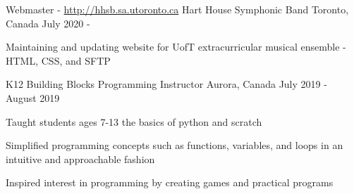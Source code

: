 

\begin{cventries}

  \cventry
  {Webmaster - \url{http://hhsb.sa.utoronto.ca}} %
  {Hart House Symphonic Band} %
  {Toronto, Canada} %
  {July 2020 - } %
  {
    \begin{cvitems} %
      \item {Maintaining and updating website for UofT extracurricular musical ensemble - HTML, CSS, and SFTP}
    \end{cvitems}
  }

  \cventry
  {K12 Building Blocks} %
  {Programming Instructor} %
  {Aurora, Canada} %
  {July 2019 - August 2019} %
  {
    \begin{cvitems} %
      \item {Taught students ages 7-13 the basics of python and scratch}
      \item { Simplified programming concepts such as functions, variables, and loops in an intuitive and approachable fashion}
      \item {Inspired interest in programming by creating games and practical programs}
    \end{cvitems}
  }

\end{cventries}